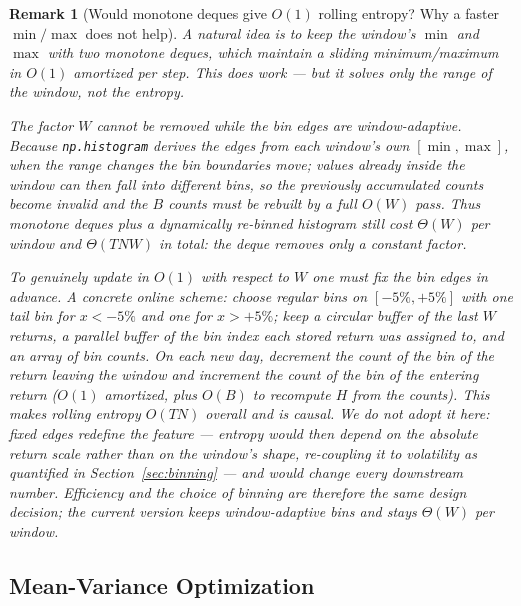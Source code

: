 \documentclass[a4paper,12pt]{article}
\newtheorem{remark}{Remark}[section]
\begin{document}
\begin{remark}[Would monotone deques give $O(1)$ rolling entropy? Why a faster $\min/\max$ does not help]
\label{rem:deque}
A natural idea is to keep the window's $\min$ and $\max$ with two \emph{monotone deques}, which maintain a sliding minimum/maximum in $O(1)$ amortized per step. This does work --- but it solves only the \emph{range} of the window, not the entropy.

The factor $W$ cannot be removed while the bin edges are \emph{window-adaptive}. Because \texttt{np.histogram} derives the edges from each window's own $[\min,\max]$, when the range changes the bin \emph{boundaries} move; values already inside the window can then fall into different bins, so the previously accumulated counts become invalid and the $B$ counts must be rebuilt by a full $O(W)$ pass. Thus monotone deques plus a dynamically re-binned histogram still cost $\Theta(W)$ per window and $\Theta(TNW)$ in total: the deque removes only a constant factor.

To genuinely update in $O(1)$ with respect to $W$ one must \emph{fix} the bin edges in advance. A concrete online scheme: choose regular bins on $[-5\%,+5\%]$ with one tail bin for $x<-5\%$ and one for $x>+5\%$; keep a \emph{circular buffer} of the last $W$ returns, a parallel buffer of \emph{the bin index} each stored return was assigned to, and an array of bin \emph{counts}. On each new day, decrement the count of the bin of the return leaving the window and increment the count of the bin of the entering return ($O(1)$ amortized, plus $O(B)$ to recompute $H$ from the counts). This makes rolling entropy $O(TN)$ overall and is causal. We do \emph{not} adopt it here: fixed edges redefine the feature --- entropy would then depend on the absolute return scale rather than on the window's shape, re-coupling it to volatility as quantified in Section~\ref{sec:binning} --- and would change every downstream number. Efficiency and the choice of binning are therefore the same design decision; the current version keeps window-adaptive bins and stays $\Theta(W)$ per window.
\end{remark}

\subsection{Mean-Variance Optimization}
\end{document}
